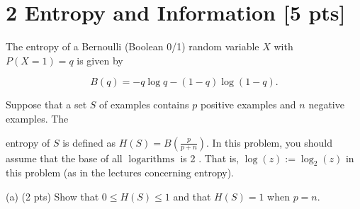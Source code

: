 \documentclass[10pt]{article}
\begin{document}
\section*{2 Entropy and Information [5 pts]}
The entropy of a Bernoulli (Boolean 0/1) random variable $X$ with $P(X=1)=q$ is given by

$$
B(q)=-q \log q-(1-q) \log (1-q) .
$$

Suppose that a set $S$ of examples contains $p$ positive examples and $n$ negative examples. The

entropy of $S$ is defined as $H(S)=B\left(\frac{p}{p+n}\right)$. In this problem, you should assume that the base of all $\operatorname{logarithms}$ is 2 . That is, $\log (z):=\log _{2}(z)$ in this problem (as in the lectures concerning entropy).

(a) (2 pts) Show that $0 \leq H(S) \leq 1$ and that $H(S)=1$ when $p=n$.
\end{document}
